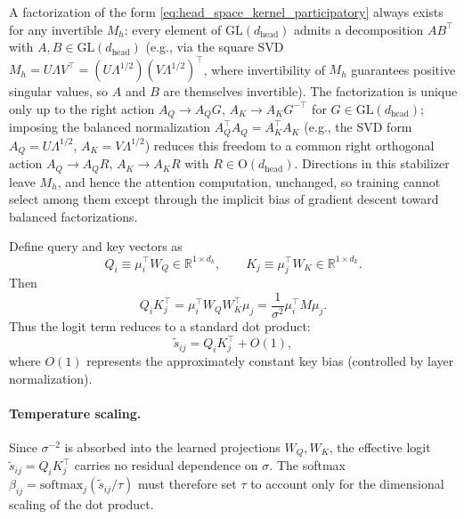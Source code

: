 \documentclass[11pt]{article}
\begin{document}
A factorization of the form \eqref{eq:head_space_kernel_participatory} always exists for any invertible $M_h$: every element of $\mathrm{GL}(d_{\text{head}})$ admits a decomposition $A B^\top$ with $A, B \in \mathrm{GL}(d_{\text{head}})$ (e.g., via the square SVD $M_h = U\Lambda V^\top = (U\Lambda^{1/2})(V\Lambda^{1/2})^\top$, where invertibility of $M_h$ guarantees positive singular values, so $A$ and $B$ are themselves invertible). The factorization is unique only up to the right action $A_Q \to A_Q G$, $A_K \to A_K G^{-\top}$ for $G \in \mathrm{GL}(d_{\text{head}})$; imposing the balanced normalization $A_Q^\top A_Q = A_K^\top A_K$ (e.g., the SVD form $A_Q = U\Lambda^{1/2}$, $A_K = V\Lambda^{1/2}$) reduces this freedom to a common right orthogonal action $A_Q \to A_Q R$, $A_K \to A_K R$ with $R \in \mathrm{O}(d_{\text{head}})$. Directions in this stabilizer leave $M_h$, and hence the attention computation, unchanged, so training cannot select among them except through the implicit bias of gradient descent toward balanced factorizations.

Define query and key vectors as
\begin{equation}
Q_i \equiv \mu_i^\top W_Q \in \mathbb{R}^{1\times d_k}, \qquad K_j \equiv \mu_j^\top W_K \in \mathbb{R}^{1\times d_k}.
\end{equation}
Then
\begin{equation}
Q_i K_j^\top = \mu_i^\top W_Q W_K^\top \mu_j = \frac{1}{\sigma^2}\mu_i^\top M \mu_j.
\end{equation}
Thus the logit term reduces to a standard dot product:
\begin{equation}
\tilde{s}_{ij} = Q_i K_j^\top + O(1),
\end{equation}
where $O(1)$ represents the approximately constant key bias (controlled by layer normalization).

\paragraph{Temperature scaling.}
Since $\sigma^{-2}$ is absorbed into the learned projections $W_Q, W_K$, the effective logit $\tilde{s}_{ij} = Q_i K_j^\top$ carries no residual dependence on $\sigma$. The softmax $\beta_{ij} = \mathrm{softmax}_j(\tilde{s}_{ij}/\tau)$ must therefore set $\tau$ to account only for the dimensional scaling of the dot product.
\end{document}
